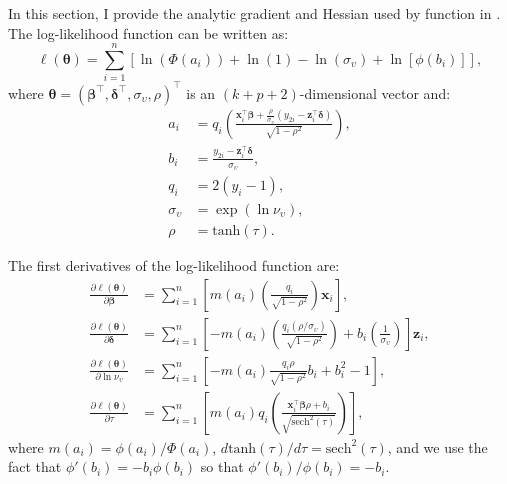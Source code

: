 In this section, I provide the analytic gradient and Hessian used by  function in . The log-likelihood function can be written as:
\begin{equation*}
\ell(\boldsymbol \theta) = \sum_{i = 1}^n\left[\ln\left(\Phi(a_i)\right)+\ln(1)-\ln\left(\sigma_{\upsilon}\right)+\ln\left[\phi(b_i)\right]\right],
\end{equation*}
where \(\boldsymbol \theta= \left(\boldsymbol \beta^\top, \boldsymbol \delta^\top, \sigma_{\upsilon}, \rho\right)^\top\) is an \((k + p + 2)\)-dimensional vector and:
\begin{equation*}
\begin{aligned}
  a_i & =  q_i\left(\frac{\mathbf x_i^\top\boldsymbol \beta+ \frac{\rho}{\sigma_{\upsilon}}\left(y_{2i}-\mathbf z_i^\top\boldsymbol \delta\right)}{\sqrt{1-\rho^2}}\right),\\
  b_i & = \frac{y_{2i}-\mathbf z_i^\top\boldsymbol \delta}{\sigma_{\upsilon}},\\
  q_i & = 2(y_i - 1),\\
  \sigma_{\upsilon} &= \exp(\ln \nu_{\upsilon}), \\
  \rho & = \text{tanh}(\tau). 
\end{aligned}
\end{equation*}

The first derivatives of the log-likelihood function are:
\begin{equation*}
\begin{aligned}
\frac{\partial \ell(\boldsymbol \theta)}{\partial \boldsymbol \beta} & = \sum_{i = 1}^n\left[m(a_i)\left(\frac{q_i}{\sqrt{1-\rho^2}}\right)\mathbf x_i\right], \\
\frac{\partial \ell(\boldsymbol \theta)}{\partial \boldsymbol \delta} & = \sum_{i = 1}^n\left[-m(a_i)\left(\frac{q_i\left(\rho/\sigma_{\upsilon}\right)}{\sqrt{1-\rho^2}}\right)+b_i\left(\frac{1}{\sigma_{\upsilon}}\right)\right]\mathbf z_i, \\
\frac{\partial \ell(\boldsymbol \theta)}{\partial \ln \nu_{\upsilon}} & = \sum_{i = 1}^n\left[-m(a_i)\frac{q_i\rho}{\sqrt{1-\rho^2}}b_i+b_i^2-1\right], \\
\frac{\partial \ell(\boldsymbol \theta)}{\partial \tau}
& = \sum_{i = 1}^n\left[m(a_i)q_i\left(\frac{\mathbf x_i^\top\boldsymbol \beta\rho +    b_i}{\sqrt{\text{sech}^2(\tau)}}\right)\right],
\end{aligned}
\end{equation*}
where \(m(a_i)=\phi(a_i)/\Phi(a_i)\), \(d\text{tanh}(\tau)/d\tau = \text{sech}^2(\tau)\), and we use the fact that \(\phi'(b_i)= -b_i\phi(b_i)\) so that \(\phi'(b_i)/\phi(b_i)=-b_i\).

